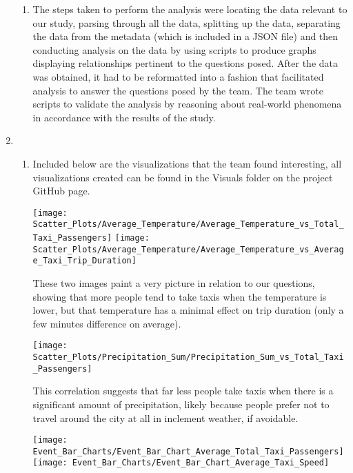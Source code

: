 \documentclass{article}
\begin{document}
\begin{enumerate}
\begin{enumerate}
        \item %

        The steps taken to perform the analysis were locating the data relevant to our study, parsing through all the data, splitting up the data, separating the data from the metadata (which is included in a JSON file) and then conducting analysis on the data by using scripts to produce graphs displaying relationships pertinent to the questions posed. After the data was obtained, it had to be reformatted into a fashion that facilitated analysis to answer the questions posed by the team. The team wrote scripts to validate the analysis by reasoning about real-world phenomena in accordance with the results of the study.

    \end{enumerate}

    \item %
    \begin{enumerate}

        \item %

        Included below are the visualizations that the team found interesting, all visualizations created can be found in the Visuals folder on the project GitHub page.

        \texttt{[image: Scatter\_Plots/Average\_Temperature/Average\_Temperature\_vs\_Total\_Taxi\_Passengers]}
        \texttt{[image: Scatter\_Plots/Average\_Temperature/Average\_Temperature\_vs\_Average\_Taxi\_Trip\_Duration]}
        
        These two images paint a very picture in relation to our questions, showing that more people tend to take taxis when the temperature is lower, but that temperature has a minimal effect on trip duration (only a few minutes difference on average).
        
        \begin{center}
            \texttt{[image: Scatter\_Plots/Precipitation\_Sum/Precipitation\_Sum\_vs\_Total\_Taxi\_Passengers]}
        \end{center}
        
        This correlation suggests that far less people take taxis when there is a significant amount of precipitation, likely because people prefer not to travel around the city at all in inclement weather, if avoidable.
        
        \texttt{[image: Event\_Bar\_Charts/Event\_Bar\_Chart\_Average\_Total\_Taxi\_Passengers]}
        \texttt{[image: Event\_Bar\_Charts/Event\_Bar\_Chart\_Average\_Taxi\_Speed]}
        

\end{enumerate}
\end{enumerate}
\end{document}
